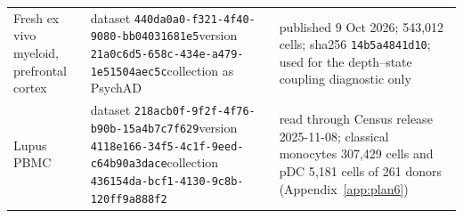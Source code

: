 \begin{table}[!ht]
\begin{tabular}{@{}p{1.15in}p{2.55in}p{2.55in}@{}}
Fresh ex vivo myeloid, prefrontal cortex \citep{Lee2026} & dataset \nolinkurl{440da0a0-f321-4f40-9080-bb04031681e5}\newline version \nolinkurl{21a0c6d5-658c-434e-a479-1e51504aec5c}\newline collection as PsychAD & published 9 Oct 2026; 543{,}012 cells; sha256 \texttt{14b5a4841d10}; used for the depth--state coupling diagnostic only\\
Lupus PBMC \citep{Perez2022} & dataset \nolinkurl{218acb0f-9f2f-4f76-b90b-15a4b7c7f629}\newline version \nolinkurl{4118e166-34f5-4c1f-9eed-c64b90a3dace}\newline collection \nolinkurl{436154da-bcf1-4130-9c8b-120ff9a888f2} & read through Census release 2025-11-08; classical monocytes 307{,}429 cells and pDC 5{,}181 cells of 261 donors (Appendix~\ref{app:plan6})\\
\bottomrule\end{tabular}\end{table}
